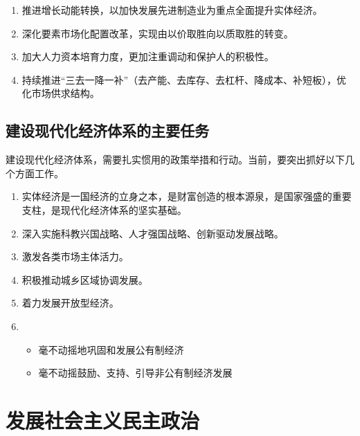         \begin{enumerate}
            \item 推进增长动能转换，以加快发展先进制造业为重点全面提升实体经济。
            \item 深化要素市场化配置改革，实现由以价取胜向以质取胜的转变。
            \item 加大人力资本培育力度，更加注重调动和保护人的积极性。
            \item 持续推进“三去一降一补”（去产能、去库存、去杠杆、降成本、补短板），优化市场供求结构。
        \end{enumerate}

    \subsection{建设现代化经济体系的主要任务}
        建设现代化经济体系，需要扎实惯用的政策举措和行动。当前，要突出抓好以下几个方面工作。
        \begin{enumerate}
            \item {}实体经济是一国经济的立身之本，是财富创造的根本源泉，是国家强盛的重要支柱，是现代化经济体系的坚实基础。
            \item {}深入实施科教兴国战略、人才强国战略、创新驱动发展战略。
            \item 激发各类市场主体活力。
            \item 积极推动城乡区域协调发展。
            \item 着力发展开放型经济。
            \item {}
            \begin{itemize}
                \item 毫不动摇地巩固和发展公有制经济
                \item 毫不动摇鼓励、支持、引导非公有制经济发展
            \end{itemize}
        \end{enumerate}


\section{发展社会主义民主政治}
